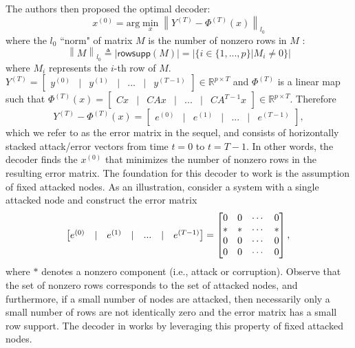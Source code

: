 \documentclass[journal]{IEEEtran}
\newcommand{\norm}[1]{\left\lVert#1\right\rVert}
\begin{document}
\noindent The authors then proposed the optimal decoder:
\begin{equation}
x^{(0)} = \text{arg} \min_{x} \norm { Y^{(T)} - \Phi ^{(T)} (x) }_{l_0} 
\label{eq:opt_decoder}
\end{equation}
where the $l_0$ ``norm" of matrix $M$ is the number of nonzero rows in $M$ \cite{Fawzi2014}:
\begin{equation}
	\norm{M} _{l_0} \triangleq \lvert \textsf{rowsupp} (M) \rvert = \lvert \{ i \in \{ 1, ... , p\} | M_i \neq 0 \}  \rvert 
	\label{eq:decoder_row}\nonumber
\end{equation}
where $M_i$ represents the $i$-th row of $M$. $Y^{(T)} = \begin{bmatrix} y^{(0)} & \lvert & y^{(1)} & \lvert  & ... & \lvert & y^{(T-1)} \end{bmatrix} \in \mathbb{R}^{p\times T}$ and $\Phi^{(T)}$ is a linear map such that $\Phi ^{(T)} (x) = \begin{bmatrix} Cx  & \lvert & CAx  & \lvert &  ... &  \lvert & CA^{T-1} x \end{bmatrix} \in \mathbb{R}^{p\times T}$. Therefore
\begin{equation}\nonumber
Y^{(T)} - \Phi ^{(T)} (x) =  \begin{bmatrix} e^{(0)}  & \lvert & e^{(1)} & \lvert &  ... &  \lvert & e^{(T-1)} \end{bmatrix},
\end{equation}
which we refer to as the error matrix in the sequel, and consists of horizontally stacked attack/error vectors from time $t=0$ to $t=T-1$.
In other words, the decoder finds the $x^{(0)}$ that minimizes the number of nonzero rows in the resulting error matrix. The foundation for this decoder to work is the assumption of fixed attacked nodes.
As an illustration, consider a system with a single attacked node and construct the error matrix
\begin{equation}
	\begin{bmatrix} e^{(0)}  & \lvert & e^{(1)} & \lvert &  ... &  \lvert & e^{(T-1)} \end{bmatrix} = \begin{bmatrix} 0 & 0 & \cdots & 0 \\
					       * & * & \cdots & * \\
					       0 & 0 & \cdots & 0 \\
					       0 & 0 & \cdots & 0 
			\end{bmatrix}, \nonumber \\
\end{equation}
where $*$ denotes a nonzero component (i.e., attack or corruption). Observe that the set of nonzero rows corresponds to the set of attacked nodes, and furthermore, if a small number of nodes are attacked, then necessarily only a small number of rows are not identically zero and the error matrix has a small row support. The decoder in \cite{Fawzi2014} works by leveraging this property of fixed attacked nodes. 
\end{document}
